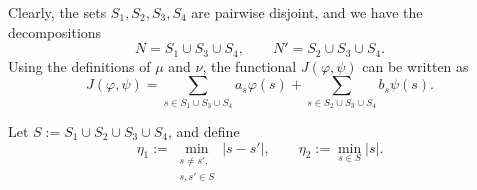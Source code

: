 \documentclass[12pt]{amsart}
\begin{document}
Clearly, the sets \( S_1, S_2, S_3, S_4 \) are pairwise disjoint, and we have the decompositions
\[
N = S_1 \cup S_3 \cup S_4, 
\qquad 
N' = S_2 \cup S_3 \cup S_4.
\]
Using the definitions of \( \mu \) and \( \nu \), the functional \( J(\varphi, \psi) \) can be written as
\begin{equation*}
    J(\varphi, \psi) 
    = \sum_{s \in S_1 \cup S_3 \cup S_4} a_s \varphi(s)
      + \sum_{s \in S_2 \cup S_3 \cup S_4} b_s \psi(s).
\end{equation*}

Let \( S := S_1 \cup S_2 \cup S_3 \cup S_4 \), and define
\begin{equation*}
    \eta_1 := \min_{\substack{s \neq s',\\ s, s' \in S}} |s - s'|,
    \qquad 
    \eta_2 := \min_{s \in S} |s|.
\end{equation*}
\end{document}
